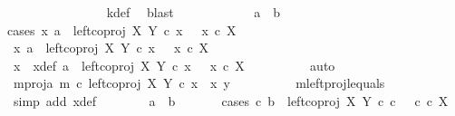 \begin{isabellebody}
\ \ \ \ \ \ \ \ \ \ \ \ \ \ \isamarkupfalse%
\ k{\isacharunderscore}{\kern0pt}def\ \isamarkupfalse%
\ blast\isanewline
\ \ \ \ \isamarkupfalse%
\isanewline
\ \isanewline
\ \ \ \ \isamarkupfalse%
\ {\isachardoublequoteopen}a\ {\isacharequal}{\kern0pt}\ b{\isachardoublequoteclose}\isanewline
\ \ \ \ \isamarkupfalse%
{\isacharparenleft}{\kern0pt}cases\ {\isachardoublequoteopen}{\isasymexists}x{\isachardot}{\kern0pt}\ a\ {\isacharequal}{\kern0pt}\ left{\isacharunderscore}{\kern0pt}coproj\ X\ Y\ {\isasymcirc}\isactrlsub c\ x\ \ {\isasymand}\ x\ {\isasymin}\isactrlsub c\ X{\isachardoublequoteclose}{\isacharparenright}{\kern0pt}\isanewline
\ \ \ \ \ \ \isamarkupfalse%
\ {\isachardoublequoteopen}{\isasymexists}x{\isachardot}{\kern0pt}\ a\ {\isacharequal}{\kern0pt}\ left{\isacharunderscore}{\kern0pt}coproj\ X\ Y\ {\isasymcirc}\isactrlsub c\ x\ \ {\isasymand}\ x\ {\isasymin}\isactrlsub c\ X{\isachardoublequoteclose}\isanewline
\ \ \ \ \ \ \isamarkupfalse%
\ \isamarkupfalse%
\ x\ \ x{\isacharunderscore}{\kern0pt}def{\isacharcolon}{\kern0pt}\ {\isachardoublequoteopen}a\ {\isacharequal}{\kern0pt}\ left{\isacharunderscore}{\kern0pt}coproj\ X\ Y\ {\isasymcirc}\isactrlsub c\ x\ \ {\isasymand}\ x\ {\isasymin}\isactrlsub c\ X{\isachardoublequoteclose}\isanewline
\ \ \ \ \ \ \ \ \isamarkupfalse%
\ auto\isanewline
\ \ \ \ \ \ \isamarkupfalse%
\ \isamarkupfalse%
\ m{\isacharunderscore}{\kern0pt}proj{\isacharunderscore}{\kern0pt}a{\isacharcolon}{\kern0pt}\ {\isachardoublequoteopen}m\ {\isasymcirc}\isactrlsub c\ left{\isacharunderscore}{\kern0pt}coproj\ X\ Y\ {\isasymcirc}\isactrlsub c\ x\ {\isacharequal}{\kern0pt}\ {\isasymlangle}x{\isacharcomma}{\kern0pt}\ y{}{\isasymrangle}{\isachardoublequoteclose}\isanewline
\ \ \ \ \ \ \ \ \isamarkupfalse%
\ m{\isacharunderscore}{\kern0pt}leftproj{\isacharunderscore}{\kern0pt}l{\isacharunderscore}{\kern0pt}equals\ \isamarkupfalse%
\ {\isacharparenleft}{\kern0pt}simp\ add{\isacharcolon}{\kern0pt}\ x{\isacharunderscore}{\kern0pt}def{\isacharparenright}{\kern0pt}\isanewline
\ \ \ \ \ \ \isamarkupfalse%
\ {\isachardoublequoteopen}a\ {\isacharequal}{\kern0pt}\ b{\isachardoublequoteclose}\isanewline
\ \ \ \ \ \ \isamarkupfalse%
{\isacharparenleft}{\kern0pt}cases\ {\isachardoublequoteopen}{\isasymexists}c{\isachardot}{\kern0pt}\ b\ {\isacharequal}{\kern0pt}\ left{\isacharunderscore}{\kern0pt}coproj\ X\ Y\ {\isasymcirc}\isactrlsub c\ c\ \ {\isasymand}\ c\ {\isasymin}\isactrlsub c\ X{\isachardoublequoteclose}{\isacharparenright}{\kern0pt}\isanewline

\end{isabellebody}
